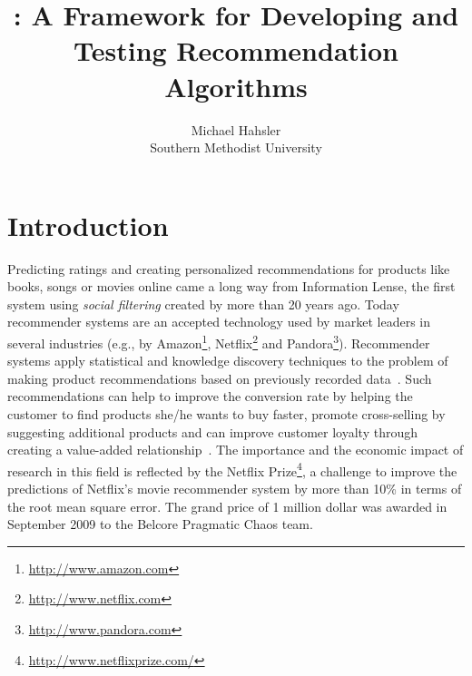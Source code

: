 \documentclass[nojss]{jss}
\author{Michael Hahsler\\Southern Methodist University}
\title{\pkg{recommenderlab}: A Framework for Developing and Testing Recommendation Algorithms}
\begin{document}




\section{Introduction}
Predicting ratings and creating personalized recommendations for products like
books, songs or movies online came a long way from
Information Lense,
the first system using
\emph{social filtering} created by \cite{recommender:Malone:1987} more than 20
years ago.  Today recommender systems are an accepted technology used by market
leaders in several industries (e.g., by
Amazon\footnote{\url{http://www.amazon.com}},
Netflix\footnote{\url{http://www.netflix.com}} and
Pandora\footnote{\url{http://www.pandora.com}}).
Recommender
systems apply statistical and knowledge discovery techniques to the problem of
making product recommendations based on previously recorded
data~\citep{recommender:Sarwar:2000}.  Such
recommendations can help to improve the conversion rate by helping
the customer to find
products she/he wants to buy faster, promote cross-selling by suggesting
additional products and can improve customer loyalty through creating a
value-added relationship~\citep{recommender:Schafer:2001}.  The importance and
the economic impact of research in this field is reflected by the Netflix
Prize\footnote{\url{http://www.netflixprize.com/}}, a challenge to improve
the predictions of Netflix's movie recommender system by more than
10\% in terms
of the root mean square error. The grand price of 1 million dollar was
awarded in September 2009 to the Belcore Pragmatic Chaos team.
\end{document}
